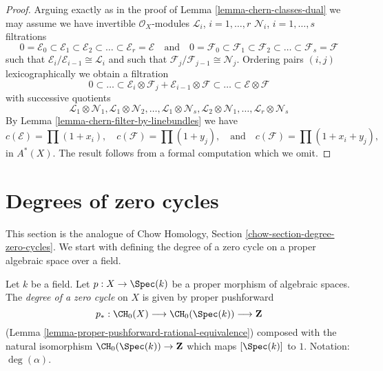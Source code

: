 \begin{proof}
Arguing exactly as in the proof of Lemma \ref{lemma-chern-classes-dual}
we may assume we have
invertible $\mathcal{O}_X$-modules
${\mathcal L}_i$, $i = 1, \ldots, r$
${\mathcal N}_i$, $i = 1, \ldots, s$
filtrations
$$
0 = \mathcal{E}_0 \subset \mathcal{E}_1 \subset \mathcal{E}_2
\subset \ldots \subset \mathcal{E}_r = \mathcal{E}
\quad\text{and}\quad
0 = \mathcal{F}_0 \subset \mathcal{F}_1 \subset \mathcal{F}_2
\subset \ldots \subset \mathcal{F}_s = \mathcal{F}
$$
such that $\mathcal{E}_i/\mathcal{E}_{i - 1} \cong \mathcal{L}_i$
and such that $\mathcal{F}_j/\mathcal{F}_{j - 1} \cong \mathcal{N}_j$.
Ordering pairs $(i, j)$ lexicographically
we obtain a filtration
$$
0 \subset \ldots \subset
\mathcal{E}_i \otimes \mathcal{F}_j
+
\mathcal{E}_{i - 1} \otimes \mathcal{F}
\subset \ldots \subset \mathcal{E} \otimes \mathcal{F}
$$
with successive quotients
$$
\mathcal{L}_1 \otimes \mathcal{N}_1,
\mathcal{L}_1 \otimes \mathcal{N}_2,
\ldots,
\mathcal{L}_1 \otimes \mathcal{N}_s,
\mathcal{L}_2 \otimes \mathcal{N}_1,
\ldots,
\mathcal{L}_r \otimes \mathcal{N}_s
$$
By Lemma \ref{lemma-chern-filter-by-linebundles}
we have
$$
c(\mathcal{E}) = \prod (1 + x_i),
\quad
c(\mathcal{F}) = \prod (1 + y_j),
\quad\text{and}\quad
c(\mathcal{F}) = \prod (1 + x_i + y_j),
$$
in $A^*(X)$. The result follows from a formal computation
which we omit.
\end{proof}











\section{Degrees of zero cycles}
\label{section-degree-zero-cycles}

\noindent
This section is the analogue of Chow Homology, Section
\ref{chow-section-degree-zero-cycles}.
We start with defining the degree of a zero cycle on a proper
algebraic space over a field.

\begin{definition}
\label{definition-degree-zero-cycle}
Let $k$ be a field. Let $p : X \to \Spec(k)$ be a proper morphism of
algebraic spaces. The {\it degree of a zero cycle} on $X$ is given by
proper pushforward
$$
p_* : \CH_0(X) \longrightarrow \CH_0(\Spec(k)) \longrightarrow \mathbf{Z}
$$
(Lemma \ref{lemma-proper-pushforward-rational-equivalence})
composed with the natural isomorphism $\CH_0(\Spec(k)) \to \mathbf{Z}$
which maps $[\Spec(k)]$ to $1$. Notation: $\deg(\alpha)$.
\end{definition}

